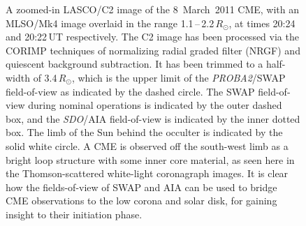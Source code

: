 \documentclass[namedreferences]{solarphysics}
\begin{document}
\begin{article}
\begin{figure}[ht]
\caption{A zoomed-in LASCO/C2 image of the 8~March~2011 CME, with an MLSO/Mk4 image overlaid in the range 1.1\,--\,2.2\,$R_\odot$, at times 20:24 and 20:22\,UT respectively. The C2 image has been processed via the CORIMP techniques of normalizing radial graded filter (NRGF) and quiescent background subtraction. It has been trimmed to a half-width of 3.4\,$R_\odot$, which is the upper limit of the \emph{PROBA2}/SWAP field-of-view as indicated by the dashed circle. The SWAP field-of-view during nominal operations is indicated by the outer dashed box, and the \emph{SDO}/AIA field-of-view is indicated by the inner dotted box. The limb of the Sun behind the occulter is indicated by the solid white circle. A CME is observed off the south-west limb as a bright loop structure with some inner core material, as seen here in the Thomson-scattered white-light coronagraph images. It is clear how the fields-of-view of SWAP and AIA can be used to bridge CME observations to the low corona and solar disk, for gaining insight to their initiation phase.}
\label{overlays}
\end{figure}



\end{article}
\end{document}
